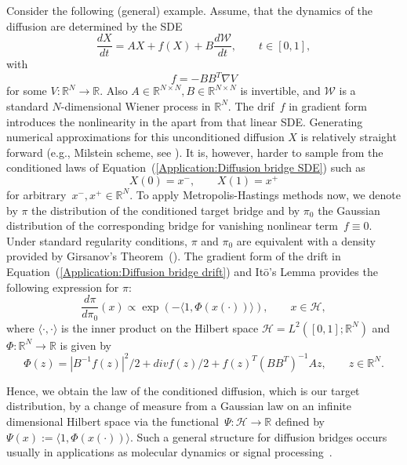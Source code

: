 Consider the following (general) example. Assume, that the dynamics of the diffusion are determined by the SDE
\begin{equation}
 \label{Application:Diffusion bridge SDE}
 \frac{dX}{dt} = AX + f(X) + B \frac{d\mathcal{W}}{dt}, \qquad t \in [0,1],
\end{equation}
with
\begin{equation}
 \label{Application:Diffusion bridge drift}
 f = - B B^T \nabla V
\end{equation}
for some $V: \mathbb{R}^N \to \mathbb{R}$. Also $A \in \mathbb{R}^{N \times N}, B \in \mathbb{R}^{N \times N}$ is invertible, and $\mathcal{W}$ is a standard $N$-dimensional Wiener process in $\mathbb{R}^N$. The drif~$f$ in gradient form introduces the nonlinearity in the apart from that linear SDE. Generating numerical approximations for this unconditioned diffusion $X$ is relatively straight forward (e.g., Milstein scheme, see \autocite{Kloeden1992}). It is, however, harder to sample from the conditioned laws of Equation~(\ref{Application:Diffusion bridge SDE}) such as 
\begin{equation}
 X(0) = x^-, \qquad X(1) = x^+
\end{equation}
for arbitrary~$x^-, x^+ \in \mathbb{R}^N$. To apply Metropolis-Hastings methods now, we denote by $\pi$ the distribution of the conditioned target bridge and by $\pi_0$ the Gaussian distribution of the corresponding bridge for vanishing nonlinear term~$f \equiv 0$. Under standard regularity conditions, $\pi$ and $\pi_0$ are equivalent with a density provided by Girsanov's Theorem~(\autocite{Oksendal2003}). The gradient form of the drift in Equation~(\ref{Application:Diffusion bridge drift}) and It\={o}'s Lemma provides the following expression for $\pi$:
\begin{equation}
 \frac{d\pi}{d\pi_0} (x) \varpropto \exp (- \langle 1, \Phi (x(\cdot)) \rangle ), \qquad x \in \mathcal{H},
\end{equation}
where $\langle \cdot, \cdot \rangle$ is the inner product on the Hilbert space $\mathcal{H} = L^2 ([0,1]; \mathbb{R}^N)$ and $\Phi: \mathbb{R}^N \to \mathbb{R}$ is given by 
\begin{equation}
 \Phi(z) = |B^{-1}f(z)|^2 /2 + div f(z) /2 + f(z)^T ( B B^T)^{-1} Az, \qquad z \in \mathbb{R}^N.
\end{equation}

Hence, we obtain the law of the conditioned diffusion, which is our target distribution, by a change of measure from a Gaussian law on an infinite dimensional Hilbert space via the functional~$\Psi: \mathcal{H} \to \mathbb{R}$ defined by $\Psi (x) := \langle 1, \Phi(x(\cdot)) \rangle $. Such a general structure for diffusion bridges occurs usually in applications as molecular dynamics or signal processing~\autocite{Beskos2008, Beskos2009, Hairer2011}.


